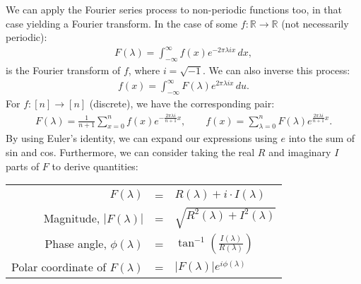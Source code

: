 We can apply the Fourier series process to non-periodic functions too, in that
case yielding a Fourier transform. In the case of some $f : \mathbb{R} \to
\mathbb{R}$ (not necessarily periodic): \begin{gather*}
    F(\lambda) = \int_{-\infty}^\infty f(x) e^{-2\pi\lambda ix} \, dx,
\end{gather*} is the Fourier transform of $f$, where $i = \sqrt{-1}$.
We can also inverse this process: \begin{gather*}
    f(x) = \int_{-\infty}^\infty F(\lambda) e^{2\pi\lambda ix} \, du.
\end{gather*} For $f : [n] \to [n]$ (discrete), we have the corresponding
pair: \begin{gather*}
    F(\lambda) = \frac{1}{n + 1} \sum_{x = 0}^{n} f(x) e^{-\frac{2\pi\lambda i}{n + 1}x}
    , \qquad
    f(x) = \sum_{\lambda = 0}^{n} F(\lambda) e^{\frac{2\pi\lambda i}{n + 1}x}.
\end{gather*} By using Euler's identity, we can expand our expressions using
$e$ into the sum of sin and cos. Furthermore, we can consider taking the real
$R$ and imaginary $I$ parts of $F$ to derive quantities: \begin{center}
    \begin{tabular}{ r c l }
        $F(\lambda)$                     & = & $R(\lambda) + i \cdot I(\lambda)$ \\
        Magnitude, $|F(\lambda)|$        & = & $\sqrt{R^2(\lambda) + I^2(\lambda)}$ \\
        Phase angle, $\phi(\lambda)$  & = & $\tan^{-1}\left( \frac{I(\lambda)}{R(\lambda)} \right)$\\
        Polar coordinate of $F(\lambda)$ & = & $|F(\lambda)|e^{i\phi(\lambda)}$
    \end{tabular}
\end{center}